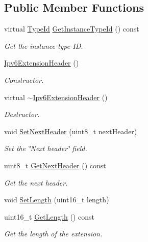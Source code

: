 \subsection*{Public Member Functions}
\begin{DoxyCompactItemize}
\item 
virtual \hyperlink{classns3_1_1TypeId}{Type\+Id} \hyperlink{classns3_1_1Ipv6ExtensionHeader_ab92a523ab61f9f3ef300b7eaed50bb9e}{Get\+Instance\+Type\+Id} () const 
\begin{DoxyCompactList}\small\item\em Get the instance type ID. \end{DoxyCompactList}\item 
\hyperlink{classns3_1_1Ipv6ExtensionHeader_a5f30d267a679174a212e130765348b0a}{Ipv6\+Extension\+Header} ()
\begin{DoxyCompactList}\small\item\em Constructor. \end{DoxyCompactList}\item 
virtual \hyperlink{classns3_1_1Ipv6ExtensionHeader_a9350d9d23099a2736f1bdd79ef23c23e}{$\sim$\+Ipv6\+Extension\+Header} ()
\begin{DoxyCompactList}\small\item\em Destructor. \end{DoxyCompactList}\item 
void \hyperlink{classns3_1_1Ipv6ExtensionHeader_a750a50791b7710a151ea61dad7063256}{Set\+Next\+Header} (uint8\+\_\+t next\+Header)
\begin{DoxyCompactList}\small\item\em Set the \char`\"{}\+Next header\char`\"{} field. \end{DoxyCompactList}\item 
uint8\+\_\+t \hyperlink{classns3_1_1Ipv6ExtensionHeader_a8bcd0646a2fe4c335270fc1d9d336324}{Get\+Next\+Header} () const 
\begin{DoxyCompactList}\small\item\em Get the next header. \end{DoxyCompactList}\item 
void \hyperlink{classns3_1_1Ipv6ExtensionHeader_a57f00e2896ba99f070b7629f058d0008}{Set\+Length} (uint16\+\_\+t length)
\item 
uint16\+\_\+t \hyperlink{classns3_1_1Ipv6ExtensionHeader_ad842fe3ba452c35e994a899530295ff4}{Get\+Length} () const 
\begin{DoxyCompactList}\small\item\em Get the length of the extension. \end{DoxyCompactList}\item 

\end{DoxyCompactItemize}
